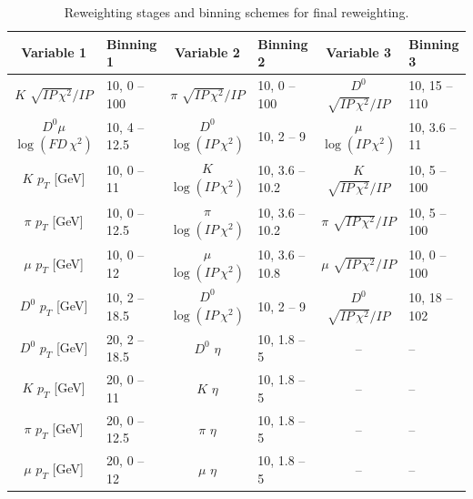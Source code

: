 \begin{landscape}
\begin{table}[p]
    \centering
    \caption{
        Reweighting stages and binning schemes for final reweighting.
    }
    \label{tab:rwt-final-vars}
    \begin{tabular}{c|l|c|l|c|l}
        \toprule
         {\bf Variable 1}             & {\bf Binning 1}   & {\bf Variable 2}               & {\bf Binning 2}   & {\bf Variable 3}                     & {\bf Binning 3}   \\
        \midrule
         $K$ $\sqrt{IP\, \chi^2} / IP$ & 10, 0 -- 100     & $\pi$ $\sqrt{IP\, \chi^2} / IP$ & 10, 0 -- 100     & $D^0$ $\sqrt{IP\, \chi^2} / IP$      & 10, 15 -- 110     \\
         $D^0\mu$ $\log(FD\, \chi^2)$  & 10, 4 -- 12.5     & $D^0$ $\log(IP\, \chi^2)$      & 10, 2 -- 9       & $\mu$ $\log(IP\, \chi^2)$            & 10, 3.6 -- 11     \\
         $K$ $p_T$ [GeV]               & 10, 0 -- 11       & $K$ $\log(IP\, \chi^2)$        & 10, 3.6 -- 10.2  & $K$ $\sqrt{IP\, \chi^2} / IP$        & 10, 5 -- 100      \\
         $\pi$ $p_T$ [GeV]             & 10, 0 -- 12.5     & $\pi$ $\log(IP\, \chi^2)$      & 10, 3.6 -- 10.2  & $\pi$ $\sqrt{IP\, \chi^2} / IP$      & 10, 5 -- 100      \\
         $\mu$ $p_T$ [GeV]             & 10, 0 -- 12       & $\mu$ $\log(IP\, \chi^2)$      & 10, 3.6 -- 10.8  & $\mu$ $\sqrt{IP\, \chi^2} / IP$      & 10, 0 -- 100      \\
         $D^0$ $p_T$ [GeV]             & 10, 2 -- 18.5     & $D^0$ $\log(IP\, \chi^2)$      & 10, 2 -- 9       & $D^0$ $\sqrt{IP\, \chi^2} / IP$      & 10, 18 -- 102     \\
         $D^0$ $p_T$ [GeV]             & 20, 2 -- 18.5     & $D^0$ $\eta$                   & 10, 1.8 -- 5     & --                                   & --                \\
         $K$ $p_T$ [GeV]               & 20, 0 -- 11       & $K$ $\eta$                     & 10, 1.8 -- 5     & --                                   & --                \\
         $\pi$ $p_T$ [GeV]             & 20, 0 -- 12.5     & $\pi$ $\eta$                   & 10, 1.8 -- 5     & --                                   & --                \\
         $\mu$ $p_T$ [GeV]             & 20, 0 -- 12       & $\mu$ $\eta$                   & 10, 1.8 -- 5     & --                                   & --                \\

\end{tabular}
\end{table}
\end{landscape}
